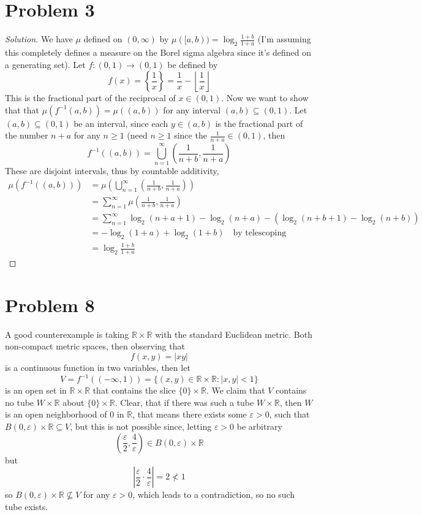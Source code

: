 \documentclass[12pt]{article}
\newcommand\set[1]{\left\lbrace #1 \right\rbrace} %
\newcommand\parens[1]{\left( #1 \right)} %
\begin{document}
\section*{Problem 3}
\begin{proof}[Solution]
We have $\mu$ defined on $(0,\infty)$ by $\mu([a,b)) = \log_2 \frac{1+b}{1+a}$ (I'm assuming this completely defines a measure on the Borel sigma algebra since it's defined on a generating set). Let $f \colon (0,1) \to (0,1)$ be defined by 
$$ f(x) = \set{\frac{1}{x}} = \frac{1}{x} - \left\lfloor \frac{1}{x} \right \rfloor $$
This is the fractional part of the reciprocal of $x \in (0,1)$.
Now we want to show that that $\mu(f^{-1}(a,b)) = \mu((a,b))$ for any interval $(a,b) \subseteq (0,1)$. Let $(a,b) \subseteq (0,1)$ be an interval, since each $y \in (a,b)$ is the fractional part of the number $n+a$ for any $n \geq 1$ (need $n \geq 1$ since the $\frac{1}{n+a} \in (0,1)$, then 
$$f^{-1}((a,b)) = \bigcup_{n=1}^\infty \parens{\frac{1}{n+b}, \frac{1}{n+a}}$$
These are disjoint intervals, thus by countable additivity,
\begin{align*}
\mu(f^{-1}((a,b))) &= \mu\left (\bigcup_{n=1}^\infty \parens{\frac{1}{n+b}, \frac{1}{n+a}}\right) \\
&= \sum_{n=1}^\infty \mu \parens{\frac{1}{n+b}, \frac{1}{n+a}}\\
&= \sum_{n=1}^\infty \log_2 (n+a+1) - \log_2(n+a) - (\log_2(n+b+1) - \log_2(n+b))\\
&= -\log_2(1+a) + \log_2(1+b) \quad \text{by telescoping}\\
&= \log_2 \frac{1+b}{1+a}
\end{align*}
\end{proof}
\pagebreak
\section*{Problem 8}
A good counterexample is taking $\mathbb{R} \times \mathbb{R}$ with the standard Euclidean metric. Both non-compact metric spaces, then observing that 
$$ f(x,y) = |xy|$$
is a continuous function in two variables, then let 
$$ V = f^{-1}((-\infty,1)) = \{(x,y) \in \mathbb{R}\times\mathbb{R} \colon |x,y|< 1\}$$
is an open set in $\mathbb{R}\times \mathbb{R}$ that contains the slice $ \{0\} \times \mathbb{R}$. We claim that  $V$ contains no tube $W \times \mathbb{R}$ about $\{0\} \times \mathbb{R}$. Clear, that if there was such a tube $W \times \mathbb{R}$, then $W$ is an open neighborhood of $0$ in $\mathbb{R}$, that means there exists some $\varepsilon > 0 $, such that $B(0,\varepsilon) \times \mathbb{R} \subseteq V$, but this is not possible since, letting $\varepsilon > 0$ be arbitrary
$$ \left( \frac{\varepsilon}{2}, \frac{4}{\varepsilon}\right) \in B(0,\varepsilon) \times \mathbb{R}$$
but 
$$ \left| \frac{\varepsilon}{2} \cdot \frac{4}{\varepsilon} \right| = 2 \nless 1 $$
so $B(0,\varepsilon) \times \mathbb{R} \nsubseteq V$ for any $\varepsilon > 0$, which leads to a contradiction, so no such tube exists. 
\end{document}
